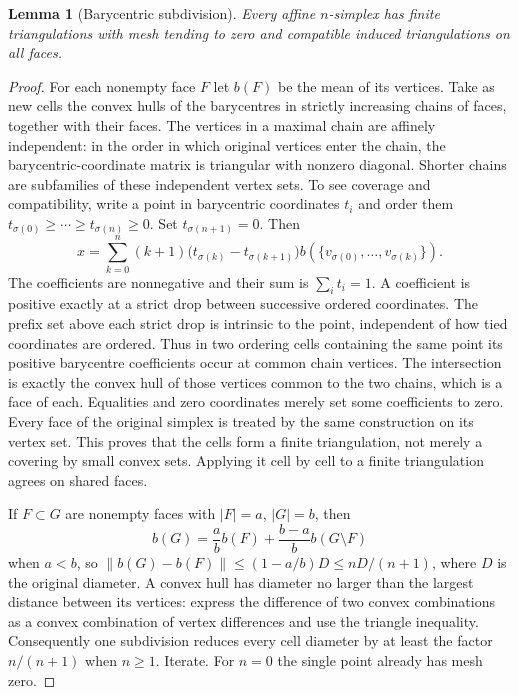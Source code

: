 \documentclass[11pt,oneside,openany]{book}
\newtheorem{lemma}[theorem]{Lemma}
\theoremstyle{definition}
\theoremstyle{remark}
\newcommand{\norm}[1]{\lVert#1\rVert}
\begin{document}
\begin{lemma}[Barycentric subdivision]\label{d10:17:subdivision}
Every affine $n$-simplex has finite triangulations with mesh tending to zero
and compatible induced triangulations on all faces.
\end{lemma}
\begin{proof}
For each nonempty face $F$ let $b(F)$ be the mean of its vertices.
Take as new cells the convex hulls of the barycentres in strictly increasing
chains of faces, together with their faces. The vertices in a maximal chain
are affinely independent: in the order in which original vertices enter the
chain, the barycentric-coordinate matrix is triangular with nonzero diagonal.
Shorter chains are subfamilies of these independent vertex sets.
To see coverage and compatibility,
write a point in barycentric coordinates $t_i$ and order them
$t_{\sigma(0)}\geq\cdots\geq t_{\sigma(n)}\geq0$. Set
$t_{\sigma(n+1)}=0$. Then
\[
 x=\sum_{k=0}^n
 (k+1)\bigl(t_{\sigma(k)}-t_{\sigma(k+1)}\bigr)
             b(\{v_{\sigma(0)},\ldots,v_{\sigma(k)}\}).
\]
The coefficients are nonnegative and their sum is
$\sum_i t_i=1$. A coefficient is positive exactly at a strict drop between
successive ordered coordinates. The prefix set above each strict drop is
intrinsic to the point, independent of how tied coordinates are ordered.
Thus in two ordering cells containing the same point its positive
barycentre coefficients occur at common chain vertices. The intersection
is exactly the convex hull of those vertices common to the two chains,
which is a face of each. Equalities and zero coordinates merely set
some coefficients to zero.
Every face of the original simplex is treated by the same construction
on its vertex set. This proves that the cells form a finite triangulation,
not merely a covering by small convex sets. Applying it cell by cell to
a finite triangulation agrees on shared faces.

If $F\subset G$ are nonempty faces with $|F|=a$, $|G|=b$, then
\[
 b(G)=\frac ab b(F)+\frac{b-a}{b}b(G\setminus F)
\]
when $a<b$, so
$\norm{b(G)-b(F)}\leq(1-a/b)D\leq nD/(n+1)$,
where $D$ is the original diameter. A convex hull has diameter no
larger than the largest distance between its vertices: express the
difference of two convex combinations as a convex combination of
vertex differences and use the triangle inequality.
Consequently one subdivision reduces every cell diameter by at least
the factor $n/(n+1)$ when $n\geq1$. Iterate. For $n=0$ the single
point already has mesh zero.
\end{proof}
\end{document}
